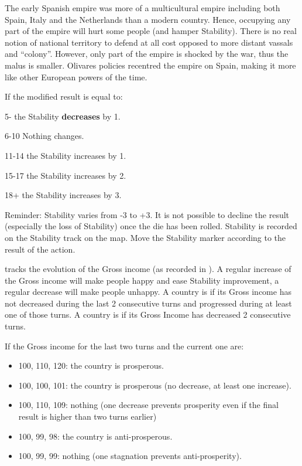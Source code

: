 \begin{designnote}
  The early Spanish empire was more of a multicultural empire including both
  Spain, Italy and the Netherlands than a modern country. Hence, occupying
  any part of the empire will hurt some people (and hamper Stability). There
  is no real notion of national territory to defend at all cost opposed to
  more distant vassals and ``colony''. However, only part of the empire is
  shocked by the war, thus the malus is smaller. Olivares policies recentred
  the empire on Spain, making it more like other European powers of the time.
\end{designnote}

\aparag[Result] If the modified result is equal to:
\begin{modlist}
  \item[5-] the Stability \textbf{decreases} by 1.
  \item[6-10] Nothing changes.
  \item[11-14] the Stability increases by 1.
  \item[15-17] the Stability increases by 2.
  \item[18+] the Stability increases by 3.
\end{modlist}
\bparag Reminder: Stability varies from -3 to +3. It is not possible to
decline the result (especially the loss of Stability) once the die has been
rolled.
\bparag Stability is recorded on the Stability track on the \ROTW map. Move
the Stability marker according to the result of the action.

\aparag[Prosperity]\label{chBudget:Prosperity} tracks the evolution of the
Gross income (as recorded in ). A regular increase
of the Gross income will make people happy and ease Stability improvement, a
regular decrease will make people unhappy.
 A country is  if its Gross income
has not decreased during the last 2 consecutive turns and progressed during at
least one of those turns.
 A country is  if its
Gross Income has decreased 2 consecutive turns.

\begin{exemple}[Prosperity]
  If the Gross income for the last two turns and the current one are:
  \begin{itemize}
  \item 100, 110, 120: the country is prosperous.
  \item 100, 100, 101: the country is prosperous (no decrease, at least one
    increase).
  \item 100, 110, 109: nothing (one decrease prevents prosperity even if the
    final result is higher than two turns earlier)
  \item 100, 99, 98: the country is anti-prosperous.
  \item 100, 99, 99: nothing (one stagnation prevents anti-prosperity).
  \end{itemize}

\end{exemple}

